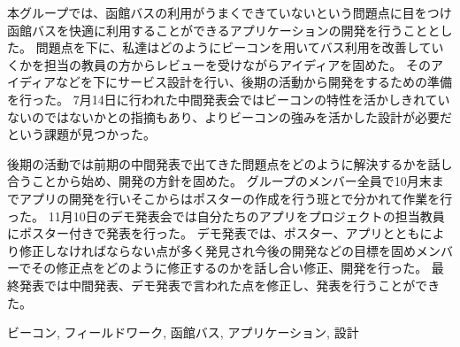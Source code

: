\documentclass[openany,11pt,papersize]{jsbook}
\begin{document}
  \maketitle
  
  \frontmatter
  
  \begin{jabstract}
  
  
  

本グループでは、函館バスの利用がうまくできていないという問題点に目をつけ函館バスを快適に利用することができるアプリケーションの開発を行うこととした。
問題点を下に、私達はどのようにビーコンを用いてバス利用を改善していくかを担当の教員の方からレビューを受けながらアイディアを固めた。
そのアイディアなどを下にサービス設計を行い、後期の活動から開発をするための準備を行った。
7月14日に行われた中間発表会ではビーコンの特性を活かしきれていないのではないかとの指摘もあり、よりビーコンの強みを活かした設計が必要だという課題が見つかった。

後期の活動では前期の中間発表で出てきた問題点をどのように解決するかを話し合うことから始め、開発の方針を固めた。
グループのメンバー全員で10月末までアプリの開発を行いそこからはポスターの作成を行う班とで分かれて作業を行った。
11月10日のデモ発表会では自分たちのアプリをプロジェクトの担当教員にポスター付きで発表を行った。
デモ発表では、ポスター、アプリとともにより修正しなければならない点が多く発見され今後の開発などの目標を固めメンバーでその修正点をどのように修正するのかを話し合い修正、開発を行った。
最終発表では中間発表、デモ発表で言われた点を修正し、発表を行うことができた。

\begin{jkeyword}
ビーコン, フィールドワーク, 函館バス, アプリケーション, 設計
\end{jkeyword}
\end{jabstract}
\end{document}
